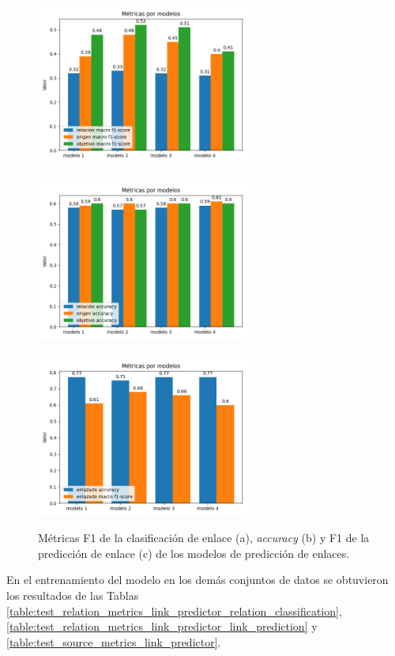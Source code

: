 \documentclass[a4paper,11pt,twocolumn,twoside]{article}
\begin{document}
\begin{figure}[h]
	\centering
	\includegraphics[width=7cm]{Graphics/persuasive_essays_all_linked_all_relation_f1_scores.png}\\
	\\
	\includegraphics[width=7cm]{Graphics/persuasive_essays_all_linked_all_relation_accuracy.png}\\
	\\
	\includegraphics[width=7cm]{Graphics/persuasive_essays_all_linked_all_relation_linked.png}\\
	\caption{Métricas F1 de la clasificación de enlace (a), \textit{accuracy} (b) y
		F1 de la predicción de enlace (c) de los modelos de predicción de enlaces.}
	\label{fig:link_prediction_model_metrics}
\end{figure}

En el entrenamiento del modelo en los demás conjuntos de datos se obtuvieron los resultados de las Tablas 
\ref{table:test_relation_metrics_link_predictor_relation_classification}, \ref{table:test_relation_metrics_link_predictor_link_prediction} 
y \ref{table:test_source_metrics_link_predictor}.
\end{document}
